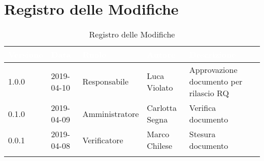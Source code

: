 \newpage

\section*{Registro delle Modifiche}

\begin{center}
\begin{longtable}[c]{|m{}|m{}|m{}|m{}|p{}|}
\hline
\rowcolor{bluelogo}\textbf{\textcolor{white}{Versione}} & \textbf{\textcolor{white}{Data}} & \textbf{\textcolor{white}{Ruolo}} & \textbf{\textcolor{white}{Autore}} & \textbf{\textcolor{white}{Descrizione}}\\
\hline \hline
\endfirsthead
1.0.0 & 2019-04-10 & Responsabile & Luca Violato & Approvazione documento per rilascio RQ \\
\hline
\rowcolor{grigio} 0.1.0 & 2019-04-09 & Amministratore & Carlotta Segna & Verifica documento \\
\hline
0.0.1 & 2019-04-08 & Verificatore & Marco Chilese & Stesura documento \\
\hline
\caption{Registro delle Modifiche}
\end{longtable}
\end{center}
